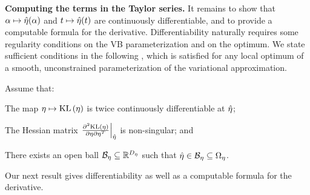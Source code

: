 \noindent \textbf{Computing the terms in the Taylor series.}  It remains to show
that $\alpha \mapsto \hat\eta(\alpha)$ and $t \mapsto \hat\eta(t)$ are
continuously differentiable, and to provide a computable formula for the
derivative.
%
Differentiability naturally requires some regularity conditions on the VB
parameterization and on the optimum.  We state sufficient conditions in the
following , which is satisfied for any local optimum of a
smooth, unconstrained parameterization of the variational approximation.

\begin{assu}
%
Assume that:
%
\begin{enumerate*}[label=(\arabic*)]
%
    \item {} The map $\eta \mapsto \mathrm{KL}\left(\eta\right)$ is twice
    continuously differentiable at $\hat\eta$;

    \item{} The Hessian matrix $\left.\frac{\partial^2 \mathrm{KL}\left(\eta\right)}{\partial \eta \partial \eta^T}\right\vert_{\hat\eta}$ is non-singular; and

    \item {} There exists an open ball $\mathcal{B}_\eta
    \subseteq \mathbb{R}^{D_{\eta}}$ such that $\hat\eta \in \mathcal{B}_\eta \subseteq
    \Omega_{\eta}$.
%
\end{enumerate*}
%
\end{assu}
%
Our next result gives differentiability as well as a computable formula for the
derivative.
%
